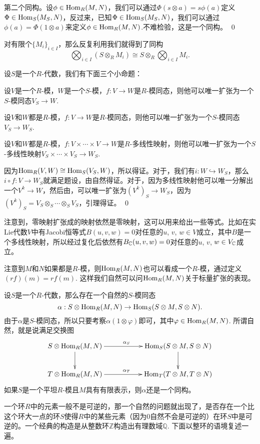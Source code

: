 第二个同构。设$\phi\in \operatorname{Hom}_R(M,N)$，我们可以通过$\Phi(s\otimes a)=s\phi(a)$定义$\Phi\in \operatorname{Hom}_S(M_S,N)$，反过来，已知$\Phi\in \operatorname{Hom}_S(M_S,N)$，我们可以通过$\phi(a)=\Phi(1\otimes a)$来定义$\phi\in \operatorname{Hom}_R(M,N)$.不难检验，这是一个同构。 \qed

对有限个$\{M_i\}_{i\in I}$，那么反复利用我们就得到了同构
\[
	\bigotimes_{i\in I} \left(S\otimes_RM_i\right)\cong S\otimes_R\bigotimes_{i\in I} M_i.
\]

\para 设$S$是一个$R$-代数，我们有下面三个小命题：

设$V$是一个$R$-模，$W$是一个$S$-模，$f:V\to W$是$R$-模同态，则他可以唯一扩张为一个$S$-模同态$V_S\to W$.

设$V$和$W$都是$R$-模，$f:V\to W$是$R$-模同态，则他可以唯一扩张为一个$S$-模同态$V_S\to W_S$.

设$V$和$W$都是$R$-模，$f:V\times\cdots\times V\to W$是$R$-多线性映射，则他可以唯一扩张为一个$S$-多线性映射$V_S\times\cdots\times V_S\to W_S$.

\proof 
	因为$\operatorname{Hom}_R(V,W)\cong \operatorname{Hom}_S(V_S,W)$，所以得证。对于，我们有$i:W\hookrightarrow W_S$，那么$i\circ f:V\to W_S$就满足题设，由自然得证。对于，因为多线性映射他可以唯一分解出一个$V^k\to W$，然后由，可以唯一扩张为$(V^k)_S\to W_S$，因为$(V^k)_S=V_S\otimes_S \cdots\otimes_S V_S$，引理得证。
\qed

注意到，零映射扩张成的映射依然是零映射，这可以用来给出一些等式。比如在实Lie代数$V$中有Jacobi恒等式$B(u,v,w)=0$对任意的$u$, $v$, $w\in V$成立，其中$B$是一个多线性映射，所以经过复化后依然有$B_{\mathbb{C}} (u,v,w)=0$对任意的$u$, $v$, $w\in V_{\mathbb{C}}$成立。

\para 注意到$M$和$N$如果都是$R$-模，则$\operatorname{Hom}_R(M,N)$也可以看成一个$R$-模，通过定义$(rf)(m)=rf(m)$. 这样我们自然可以问$\operatorname{Hom}_R(M,N)$关于标量扩张的表现。

设$S$是一个$R$-代数，那么存在一个自然的$S$-模同态
\[
	\alpha:S\otimes\operatorname{Hom}_R(M,N)\to \operatorname{Hom}_S(S\otimes M,S\otimes N).
\]
由于$\alpha$是$S$-模同态，所以只要考察$\alpha(1\otimes \varphi)$即可，其中$\varphi\in \operatorname{Hom}_R(M,N)$. 所谓自然，就是说满足交换图
\[
\begin{xy}
	\xymatrix
	{
		S\otimes\Hom_R(M,N)\ar[rr]^{\alpha_S}\ar[d]&&\Hom_S(S\otimes M,S\otimes N)\ar[d]\\
		T\otimes\Hom_R(M,N)\ar[rr]^{\alpha_T}&&\Hom_T(T\otimes M,T\otimes N)
	}
\end{xy}
\]
如果$S$是一个平坦$R$-模且$M$具有有限表示，则$\alpha$还是一个同构。

\para 一个环$R$中的元素一般不是可逆的，那一个自然的问题就出现了，是否存在一个比这个环大一点的环$S$使得$R$中的某些元素（因为0自然不会是可逆的）在环$S$中是可逆的。一个经典的构造是从整数环$\mathbb{Z}$构造出有理数域$\mathbb{Q}$. 下面以整环的语境复述一遍。

